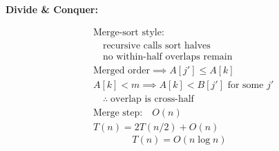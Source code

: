 \documentclass[11pt]{article}
\begin{document}
\vspace{1em}
\textbf{Divide \& Conquer:}

\noindent
\begin{minipage}[t]{0.50\textwidth}
\vspace{0pt}
\begin{algorithm}[H]
\DontPrintSemicolon
{}
\end{algorithm}
\end{minipage}%
\begin{minipage}[t]{0.50\textwidth}
\vspace{0pt}
\begin{align*}
&\text{Merge-sort style:} \\
&\quad \text{recursive calls sort halves} \\
&\quad \text{no within-half overlaps remain} \\[0.5em]
&\text{Merged order} \implies A[j'] \le A[k] \\
&A[k] < m \implies A[k] < B[j'] \text{ for some } j' \\
&\quad \therefore\; \text{overlap is cross-half} \\[1em]
&\text{Merge step:} \quad O(n) \\
&T(n) = 2T(n/2) + O(n)
\end{align*}
\[
\boxed{T(n) = O(n \log n)}
\]
\end{minipage}
\end{document}
